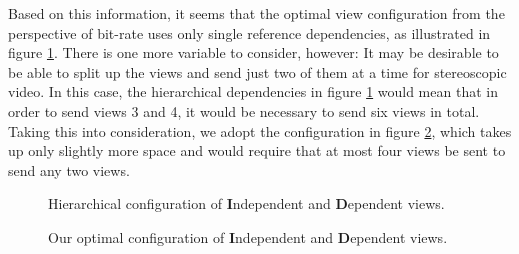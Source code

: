\documentclass[twoside, 11pt]{article}
\begin{document}
Based on this information, it seems that the optimal view configuration from the
perspective of bit-rate uses only single reference dependencies, as illustrated
in figure \ref{fig:hierarchical}. There is one more variable to consider,
however: It may be desirable to be able to split up the views and send just two
of them at a time for stereoscopic video. In this case, the hierarchical
dependencies in figure \ref{fig:hierarchical} would mean that in order to send
views 3 and 4, it would be necessary to send six views in total. Taking this
into consideration, we adopt the configuration in figure \ref{fig:optimal},
which takes up only slightly more space and would require that at most four
views be sent to send any two views.

\begin{figure}[H]
\begin{center}
\end{center}
\caption{
Hierarchical configuration of \textbf{I}ndependent and \textbf{D}ependent views.
}
\label{fig:hierarchical}
\end{figure}

\begin{figure}[H]
\begin{center}
\end{center}
\caption{
Our optimal configuration of \textbf{I}ndependent and \textbf{D}ependent views.
}
\label{fig:optimal}
\end{figure}
\end{document}
